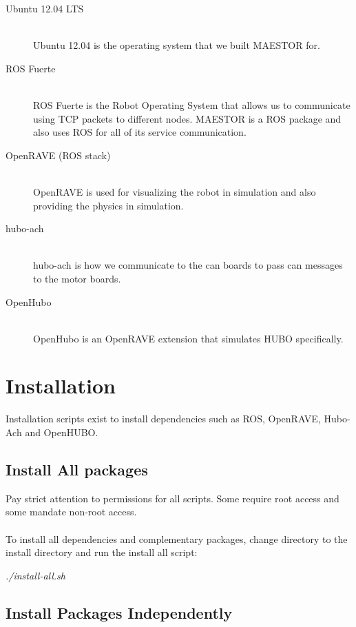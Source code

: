 \documentclass[12pt]{article}
\begin{document}
\begin{description}
	\item[Ubuntu 12.04 LTS] \hfill \\
		Ubuntu 12.04 is the operating system that we built MAESTOR for. \\
	\item[ROS Fuerte] \hfill \\
		ROS Fuerte is the Robot Operating System that allows us to communicate using TCP packets to different nodes. MAESTOR is a ROS package and also uses ROS for all of its service communication. \\
		
	\item [OpenRAVE (ROS stack)] \hfill \\
		OpenRAVE is used for visualizing the robot in simulation and also providing the physics in simulation. 
	\item [hubo-ach]\hfill \\
		hubo-ach is how we communicate to the can boards to pass can messages to the motor boards.
	\item [OpenHubo]	\hfill \\
		OpenHubo is an OpenRAVE extension that simulates HUBO specifically. 
\end{description}
\section{Installation}

Installation scripts exist to install dependencies such as ROS, OpenRAVE, Hubo-Ach and OpenHUBO.

\subsection{Install All packages}
Pay strict attention to permissions for all scripts. Some require root access and some mandate non-root access.\\
\noindent
\\To install all dependencies and complementary packages, change directory to the install directory and run the install all script:
\begin{center}
\textit{./install-all.sh}
\end{center}
\pagebreak
\subsection{Install Packages Independently}
\end{document}
